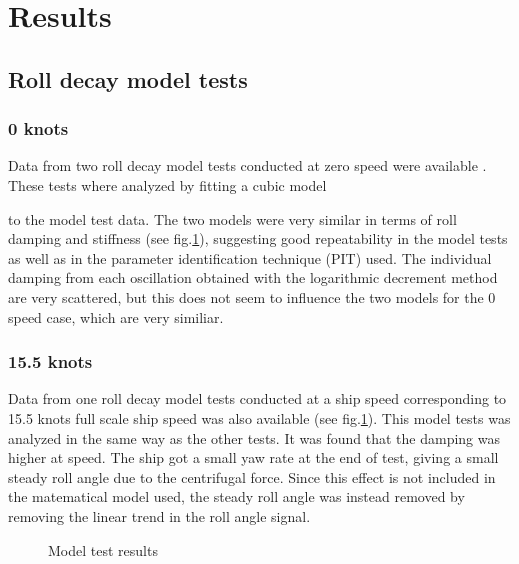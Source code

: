 \section{Results}\label{results}

    \subsection{Roll decay model tests}\label{roll-decay-model-tests}

\subsubsection{0 knots}\label{knots}

Data from two roll decay model tests conducted at zero speed were
available
.
These tests where analyzed by fitting a cubic model

to the model test data. The two models were very similar in terms of
roll damping and stiffness (see fig.\ref{fig:mdl}), suggesting good
repeatability in the model tests as well as in the parameter
identification technique (PIT) used. The individual damping from each
oscillation obtained with the logarithmic decrement method are very
scattered, but this does not seem to influence the two models for the 0
speed case, which are very similiar.

    \subsubsection{15.5 knots}\label{knots}

Data from one roll decay model tests conducted at a ship speed
corresponding to 15.5 knots full scale ship speed was also available
(see fig.\ref{fig:mdl}). This model tests was analyzed in the same
way as the other tests. It was found that the damping was higher at
speed. The ship got a small yaw rate
 at the end of test, giving a small steady roll angle due to the
centrifugal force. Since this effect is not included in the matematical
model used, the steady roll angle was instead removed by removing the
linear trend in the roll angle signal.

    

    \begin{figure}
        \begin{center}\end{center}
        \caption{Model test results}
        \label{fig:mdl}
    \end{figure}
    
